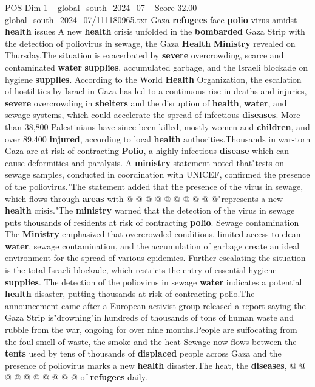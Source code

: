 \begin{textsample}{POS Dim 1 – global\_south\_2024\_07 – Score 32.00 – global\_south\_2024\_07/111180965.txt}  \label{ex:f1_pos_173}
Gaza \textbf{refugees} face \textbf{polio} virus amidst \textbf{health} issues A new \textbf{health} crisis unfolded in the \textbf{bombarded} Gaza Strip with the detection of poliovirus in sewage, the Gaza \textbf{Health} \textbf{Ministry} revealed on Thursday.The situation is exacerbated by \textbf{severe} overcrowding, scarce and contaminated \textbf{water} \textbf{supplies}, accumulated garbage, and the Israeli blockade on hygiene \textbf{supplies}.
According to the World \textbf{Health} Organization, the escalation of hostilities by Israel in Gaza has led to a continuous rise in deaths and injuries, \textbf{severe} overcrowding in \textbf{shelters} and the disruption of \textbf{health}, \textbf{water}, and sewage systems, which could accelerate the spread of infectious \textbf{diseases}.
More than 38,800 Palestinians have since been killed, mostly women and \textbf{children}, and over 89,400 \textbf{injured}, according to local \textbf{health} authorities.Thousands in war-torn Gaza are at risk of contracting \textbf{Polio}, a highly infectious \textbf{disease} which can cause deformities and paralysis.
A \textbf{ministry} statement noted that"tests on sewage samples, conducted in coordination with UNICEF, confirmed the presence of the poliovirus."The statement added that the presence of the virus in sewage, which flows through \textbf{areas} with @ @ @ @ @ @ @ @ @ @"represents a new \textbf{health} crisis."The \textbf{ministry} warned that the detection of the virus in sewage puts thousands of residents at risk of contracting \textbf{polio}.
Sewage contamination The \textbf{Ministry} emphasized that overcrowded conditions, limited access to clean \textbf{water}, sewage contamination, and the accumulation of garbage create an ideal environment for the spread of various epidemics.
Further escalating the situation is the total Israeli blockade, which restricts the entry of essential hygiene \textbf{supplies}.
The detection of the poliovirus in sewage \textbf{water} indicates a potential \textbf{health} disaster, putting thousands at risk of contracting polio.The announcement came after a European activist group released a report saying the Gaza Strip is"drowning"in hundreds of thousands of tons of human waste and rubble from the war, ongoing for over nine months.People are suffocating from the foul smell of waste, the smoke and the heat Sewage now flows between the \textbf{tents} used by tens of thousands of \textbf{displaced} people across Gaza and the presence of poliovirus marks a new \textbf{health} disaster.The heat, the \textbf{diseases}, @ @ @ @ @ @ @ @ @ @ of \textbf{refugees} daily.

\end{textsample}
